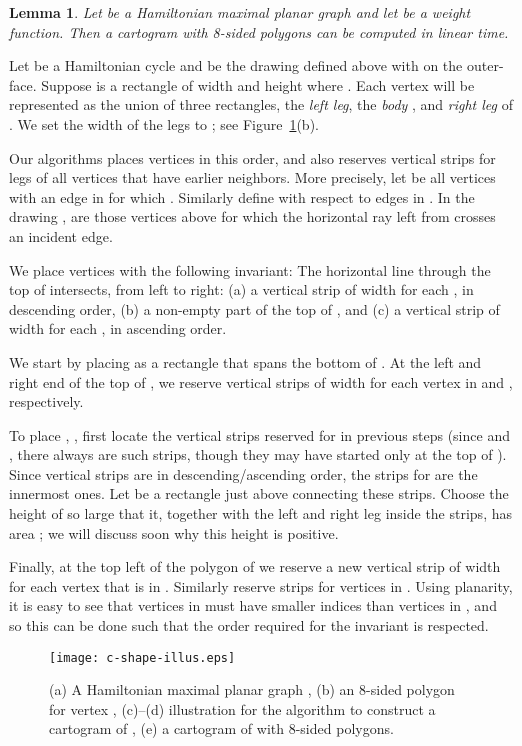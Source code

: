 \documentclass[11pt]{article}
\newtheorem{lemma}{Lemma}[section]
\newenvironment{proof}{{\bf Proof:} }{\hspace*{\fill}\vspace{2mm}}
\begin{document}
\begin{lemma}\label{lem:ham-eight}
 Let  be a Hamiltonian maximal planar graph and let  be a weight
 function. Then a cartogram with 8-sided polygons can be computed in linear time.
\end{lemma}
\begin{proof}
Let  be a Hamiltonian cycle and  be the
drawing defined above with  on the outer-face.
Suppose  is a rectangle of width  and height 
where .
Each vertex  will be represented as the union of three
 rectangles, the \textit{left leg}, the \textit{body} , and
\textit{right leg} of . We set the width of the legs to ;
see Figure~\ref{fig:c-shape-illus}(b).

Our algorithms places vertices  in this order, and also
reserves vertical strips for legs of all vertices that have earlier neighbors.
More precisely, let  be all vertices  with an edge 
in  for which .  Similarly define  with respect
to edges in .  In the drawing ,  are those vertices above
 for which the horizontal ray left from  crosses an incident edge.

We place vertices  with the following invariant: The
horizontal line through the top of  intersects, from left to right:
(a) a vertical strip of width  for
each , in descending order, (b) a non-empty part of the
top of , and (c) a vertical strip of width  for
each , in ascending order.

We start by placing  as a rectangle that spans the bottom of .
At the left and right end of the top of , we reserve vertical
strips of width  for each vertex in  and , respectively.

To place , , first locate the vertical strips reserved for
 in previous steps (since  and ,
there always are such strips, though they may have started only
at the top of ).  Since vertical strips are in
descending/ascending order, the strips for  are the innermost ones.
Let  be a rectangle just above  connecting these strips.
Choose the height of  so large that it, together with the left
and right leg inside the strips, has area ; we will discuss
soon why this height is positive.

Finally, at the top left of the
polygon of  we reserve a new vertical
strip of width  for each vertex  that is in .
Similarly reserve strips for vertices in .   Using
planarity, it is easy to see that vertices in  must have smaller
indices than vertices in , and so this can be done such that the
order required for the invariant is respected.

\begin{figure}[htbp]
\centering
\texttt{[image: c-shape-illus.eps]}
\caption{\small\sf (a) A Hamiltonian maximal planar graph , (b) an 8-sided polygon for vertex , (c)--(d) illustration
 for the algorithm to construct a cartogram of , (e) a cartogram of  with 8-sided polygons.}
\label{fig:c-shape-illus}
\end{figure}


\end{proof}
\end{document}
